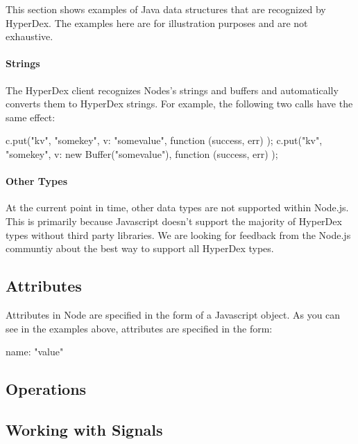 This section shows examples of Java data structures that are recognized by
HyperDex.  The examples here are for illustration purposes and are not
exhaustive.

\paragraph{Strings}

The HyperDex client recognizes Nodes's strings and buffers and automatically
converts them to HyperDex strings.  For example, the following two calls
have the same effect:

\begin{javascriptcode}
c.put("kv", "somekey", {v: "somevalue"}, function (success, err) {});
c.put("kv", "somekey", {v: new Buffer("somevalue")}, function (success, err) {});
\end{javascriptcode}

\paragraph{Other Types}

At the current point in time, other data types are not supported within Node.js.
This is primarily because Javascript doesn't support the majority of HyperDex
types without third party libraries.  We are looking for feedback from the
Node.js communtiy about the best way to support all HyperDex types.

\subsection{Attributes}
\label{sec:api:node:attributes}

Attributes in Node are specified in the form of a Javascript object.  As you can
see in the examples above, attributes are specified in the form:

\begin{javascriptcode}
{name: "value"}
\end{javascriptcode}

\subsection{Operations}
\label{sec:api:node:ops}


\pagebreak

\subsection{Working with Signals}
\label{sec:api:node:signals}

